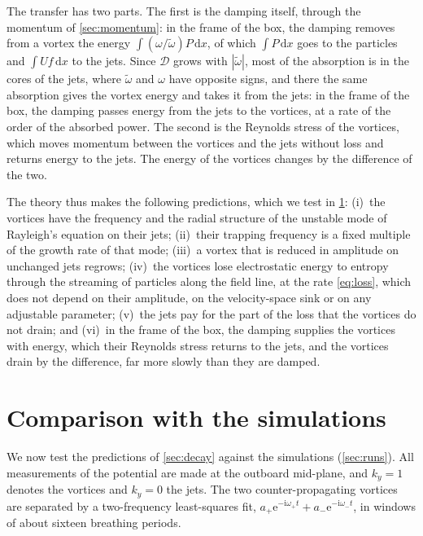 \documentclass{jpp}
\newcommand{\rmd}{\text{d}}
\newcommand{\rme}{\text{e}}
\newcommand{\rmi}{\text{i}}
\newcommand{\wt}{\tilde\omega}
\newcommand{\Dfn}{\mathcal{D}}
\begin{document}
The transfer has two parts. The first is the damping itself, through the momentum of \cref{sec:momentum}: in the frame of the box, the damping removes from a vortex the energy \(\int(\omega/\wt)P\,\rmd x\), of which \(\int P\,\rmd x\) goes to the particles and \(\int Uf\,\rmd x\) to the jets. Since \(\Dfn\) grows with \(|\wt|\), most of the absorption is in the cores of the jets, where \(\wt\) and \(\omega\) have opposite signs, and there the same absorption gives the vortex energy and takes it from the jets: in the frame of the box, the damping passes energy from the jets to the vortices, at a rate of the order of the absorbed power. The second is the Reynolds stress of the vortices, which moves momentum between the vortices and the jets without loss and returns energy to the jets. The energy of the vortices changes by the difference of the two.

The theory thus makes the following predictions, which we test in \cref{sec:data}: (i)~the vortices have the frequency and the radial structure of the unstable mode of Rayleigh's equation on their jets; (ii)~their trapping frequency is a fixed multiple of the growth rate of that mode; (iii)~a vortex that is reduced in amplitude on unchanged jets regrows; (iv)~the vortices lose electrostatic energy to entropy through the streaming of particles along the field line, at the rate \cref{eq:loss}, which does not depend on their amplitude, on the velocity-space sink or on any adjustable parameter; (v)~the jets pay for the part of the loss that the vortices do not drain; and (vi)~in the frame of the box, the damping supplies the vortices with energy, which their Reynolds stress returns to the jets, and the vortices drain by the difference, far more slowly than they are damped.

\section{Comparison with the simulations}\label{sec:data}

We now test the predictions of \cref{sec:decay} against the simulations (\cref{sec:runs}). All measurements of the potential are made at the outboard mid-plane, and \(k_y = 1\) denotes the vortices and \(k_y = 0\) the jets. The two counter-propagating vortices are separated by a two-frequency least-squares fit, \(a_+\rme^{-\rmi\omega_+t} + a_-\rme^{-\rmi\omega_-t}\), in windows of about sixteen breathing periods.
\end{document}
